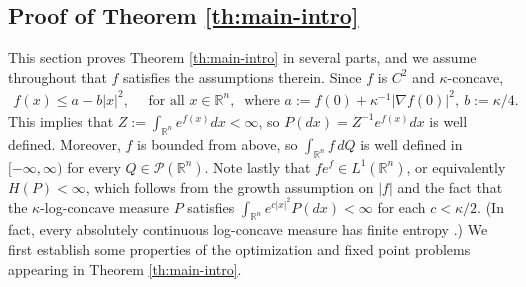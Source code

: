 \documentclass[11pt,reqno]{amsart}
\numberwithin{equation}{section}
\theoremstyle{definition}
\def\R{{\mathbb R}}
\def\P{{\mathcal P}}
\begin{document}
\subsection{Proof of Theorem \ref{th:main-intro}} \label{subsec:proofs main and log-concave}
This section proves Theorem \ref{th:main-intro} in several parts, and we assume throughout that $f$ satisfies the assumptions therein.
Since $f$ is $C^2$ and $\kappa$-concave, 
\begin{align}
f(x) \le a - b|x|^2, \quad \text{ for all } x \in \R^n, \ \text{ where } a:=f(0)+\kappa^{-1} |\nabla f(0)|^2, \ b :=\kappa/4. \label{bound-f}
\end{align}
This implies that $Z:=\int_{\R^n}e^{f(x)}dx < \infty$, so $P(dx) = Z^{-1}e^{f(x)}dx$ is well defined. 
Moreover,  $f$ is bounded from above, so $\int_{\R^n} f\, dQ$ is well defined in $[-\infty,\infty)$ for every $Q \in \P(\R^n)$. 
Note lastly that $fe^f \in L^1(\R^n)$, or equivalently $H(P) < \infty$, which follows from the growth assumption on $|f|$ and the fact that the $\kappa$-log-concave measure $P$ satisfies $\int_{\R^n} e^{c|x|^2}P(dx) < \infty$ for each $c < \kappa/2$. (In fact, every absolutely continuous log-concave measure has finite entropy \cite[Theorem I.1]{bobkov2011entropy}.) We first establish some properties of the optimization and fixed point problems appearing in Theorem \ref{th:main-intro}.
\end{document}

